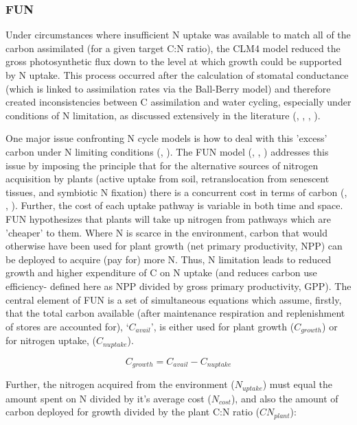 \documentclass[draft,linenumbers]{agujournal}
\begin{document}
\subsubsection{FUN}
Under circumstances where insufficient N uptake was available to match all of the carbon assimilated (for a given target C:N ratio), the CLM4 model reduced the gross photosynthetic flux down to the level at which growth could be supported by N uptake. This process occurred after the calculation of stomatal conductance (which is linked to assimilation rates via the Ball-Berry model) and therefore created inconsistencies between C assimilation and water cycling, especially under conditions of N limitation, as discussed extensively in the literature (\cite{medlyn2011}, \cite{bonan2012}, \cite{dekauwe2014}, \cite{walker2014}).

One major issue confronting N cycle models is how to deal with this 'excess' carbon under N limiting conditions (\cite{zaehle2010}, \cite{dekauwe2014}). The FUN model (\cite{fisher2010fun}, \cite{brzostek2014}, \cite{shi2016}) addresses this issue by imposing the principle that for the alternative sources of nitrogen acquisition by plants (active uptake from soil, retranslocation from senescent tissues, and symbiotic N fixation) there is a concurrent cost in terms of carbon (\cite{bloom1985}, \cite{jiang2017}, \cite{terrer2018}). Further, the cost of each uptake pathway is variable in both time and space. FUN hypothesizes that plants will take up nitrogen from pathways which are 'cheaper' to them. Where N is scarce in the environment, carbon that would otherwise have been used for plant growth (net primary productivity, NPP) can be deployed to acquire (pay for) more N. Thus, N limitation leads to reduced growth and higher expenditure of C on N uptake (and reduces carbon use efficiency- defined here as NPP divided by gross primary productivity, GPP). The central element of FUN is a set of simultaneous equations which assume, firstly, that the total carbon available (after maintenance respiration and replenishment of stores are accounted for), `$C_{avail}$', is either used for plant growth ($C_{growth}$) or for nitrogen uptake, ($C_{nuptake}$).

\begin{equation}
C_{growth}=C_{avail}-C_{nuptake}
\end{equation}

Further, the nitrogen acquired from the environment ($N_{uptake}$) must equal the amount spent on N divided by it's average cost ($N_{cost}$), and also the amount of carbon deployed for growth divided by the plant C:N ratio ($CN_{plant}$):
\end{document}
